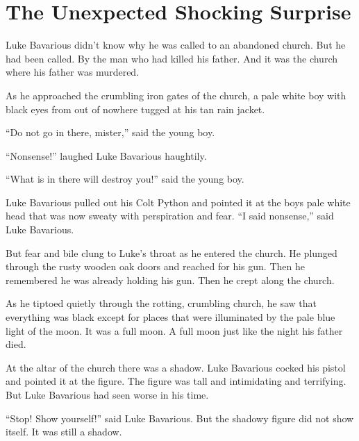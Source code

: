\chapter{The Unexpected Shocking Surprise}





Luke Bavarious didn't know why he was called to an abandoned
church. But he had been called. By the man who had killed his
father. And it was the church where his father was murdered.



As he approached the crumbling iron gates of the church, a pale
white boy with black eyes from out of nowhere tugged at his tan
rain jacket.



``Do not go in there, mister,'' said the young boy.



``Nonsense!'' laughed Luke Bavarious haughtily.



``What is in there will destroy you!'' said the young
boy.



Luke Bavarious pulled out his Colt Python and pointed it at the
boys pale white head that was now sweaty with perspiration and
fear. ``I said nonsense,'' said Luke Bavarious.



But fear and bile clung to Luke's throat as he entered the
church. He plunged through the rusty wooden oak doors and reached
for his gun. Then he remembered he was already holding his gun.
Then he crept along the church.



As he tiptoed quietly through the rotting, crumbling church, he saw
that everything was black except for places that were illuminated
by the pale blue light of the moon. It was a full moon. A full moon
just like the night his father died.



At the altar of the church there was a shadow. Luke Bavarious
cocked his pistol and pointed it at the figure. The figure was tall
and intimidating and terrifying. But Luke Bavarious had seen worse
in his time.



``Stop! Show yourself!'' said Luke Bavarious. But the
shadowy figure did not show itself. It was still a shadow.



